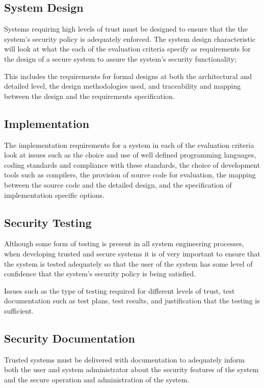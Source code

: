         \subsection{System Design}
            Systems requiring high levels of trust must be designed to
            ensure that the the system's security policy is adequately
            enforced. The system design characteristic will look at what
            the each of the evaluation criteria specify as requirements
            for the design of a secure system to assure the system's
            security functionality;

            This includes the requirements for formal designs at both
            the architectural and detailed level, the design
            methodologies used,  and traceability and mapping between
            the design and the requirements specification.

        \subsection{Implementation}
            The implementation requirements for a system in each of the
            evaluation criteria look at issues such as the choice and use of 
            well defined programming languages, coding standards and
            compliance with these standards, the choice of development
            tools such as compilers, the provision of source code for
            evaluation, the mapping between the source code and the
            detailed design, and the specification of implementation
            specific options.

        \subsection{Security Testing}
            Although some form of testing is present in all system
            engineering processes, when developing trusted and secure
            systems it is of very important to ensure that the system 
            is tested adequately so that the user of the system has some
            level of confidence that the system's security policy is
            being satisfied.

            Issues such as the type of testing required for different
            levels of trust, test documentation such as test plans, test
            results, and justification that the testing is sufficient.

        \subsection{Security Documentation}
            Trusted systems must be delivered with documentation to
            adequately inform both the user and system administrator
            about the security features of the system and the secure
            operation and administration of the system.

